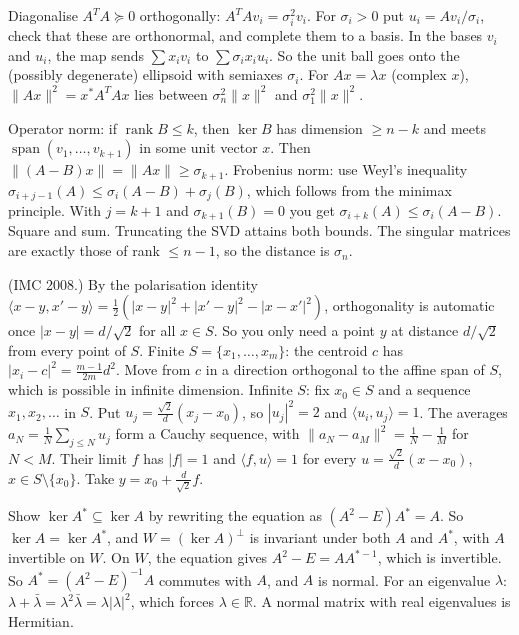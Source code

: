 \documentclass[11pt,a4paper]{article}
\begin{document}

Diagonalise \(A^TA\succeq0\) orthogonally: \(A^TAv_i=\sigma_i^2v_i\). For \(\sigma_i>0\) put \(u_i=Av_i/\sigma_i\), check that these are orthonormal, and complete them to a basis.
In the bases \(v_i\) and \(u_i\), the map sends \(\sum x_iv_i\) to \(\sum\sigma_ix_iu_i\). So the unit ball goes onto the (possibly degenerate) ellipsoid with semiaxes \(\sigma_i\). For \(Ax=\lambda x\) (complex \(x\)), \(\|Ax\|^2=x^*A^TAx\) lies between \(\sigma_n^2\|x\|^2\) and \(\sigma_1^2\|x\|^2\).

Operator norm: if \(\operatorname{rank}B\le k\), then \(\ker B\) has dimension \(\ge n-k\) and meets \(\operatorname{span}(v_1,\dots,v_{k+1})\) in some unit vector \(x\). Then \(\|(A-B)x\|=\|Ax\|\ge\sigma_{k+1}\).
Frobenius norm: use Weyl's inequality \(\sigma_{i+j-1}(A)\le\sigma_i(A-B)+\sigma_j(B)\), which follows from the minimax principle. With \(j=k+1\) and \(\sigma_{k+1}(B)=0\) you get \(\sigma_{i+k}(A)\le\sigma_i(A-B)\). Square and sum.
Truncating the SVD attains both bounds. The singular matrices are exactly those of rank \(\le n-1\), so the distance is \(\sigma_n\).

(IMC 2008.) By the polarisation identity \(\langle x-y,x'-y\rangle=\frac12(|x-y|^2+|x'-y|^2-|x-x'|^2)\), orthogonality is automatic once \(|x-y|=d/\sqrt2\) for all \(x\in S\). So you only need a point \(y\) at distance \(d/\sqrt2\) from every point of \(S\).
Finite \(S=\{x_1,\dots,x_m\}\): the centroid \(c\) has \(|x_i-c|^2=\frac{m-1}{2m}d^2\). Move from \(c\) in a direction orthogonal to the affine span of \(S\), which is possible in infinite dimension.
Infinite \(S\): fix \(x_0\in S\) and a sequence \(x_1,x_2,\dots\) in \(S\). Put \(u_j=\frac{\sqrt2}{d}(x_j-x_0)\), so \(|u_j|^2=2\) and \(\langle u_i,u_j\rangle=1\). The averages \(a_N=\frac1N\sum_{j\le N}u_j\) form a Cauchy sequence, with \(\|a_N-a_M\|^2=\frac1N-\frac1M\) for \(N<M\). Their limit \(f\) has \(|f|=1\) and \(\langle f,u\rangle=1\) for every \(u=\frac{\sqrt2}{d}(x-x_0)\), \(x\in S\setminus\{x_0\}\). Take \(y=x_0+\frac{d}{\sqrt2}f\).

Show \(\ker A^*\subseteq\ker A\) by rewriting the equation as \((A^2-E)A^*=A\). So \(\ker A=\ker A^*\), and \(W=(\ker A)^\perp\) is invariant under both \(A\) and \(A^*\), with \(A\) invertible on \(W\).
On \(W\), the equation gives \(A^2-E=AA^{*-1}\), which is invertible. So \(A^*=(A^2-E)^{-1}A\) commutes with \(A\), and \(A\) is normal.
For an eigenvalue \(\lambda\): \(\lambda+\bar\lambda=\lambda^2\bar\lambda=\lambda|\lambda|^2\), which forces \(\lambda\in\mathbb R\). A normal matrix with real eigenvalues is Hermitian.
\end{document}
